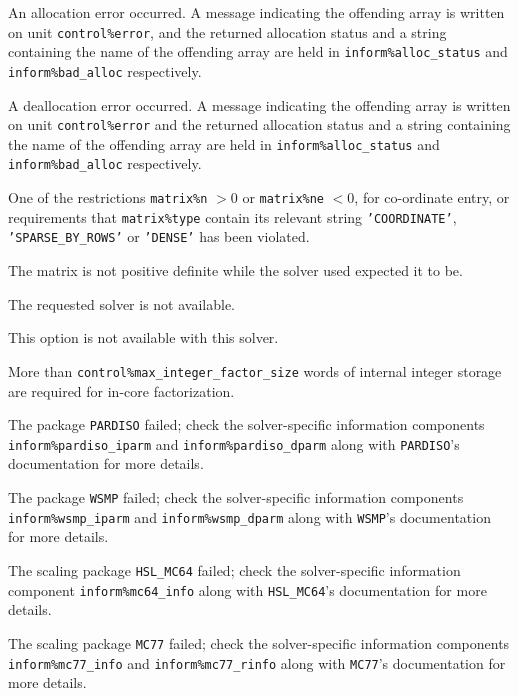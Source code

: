 \documentclass{galahad}
\begin{document}
\begin{description}

\itt{\galerrallocate} An allocation error occurred. A message indicating
the offending
array is written on unit {\tt control\%error}, and the returned allocation
status and a string containing the name of the offending array
are held in {\tt inform\%alloc\_\-status}
and {\tt inform\%bad\_alloc} respectively.

\itt{\galerrdeallocate} A deallocation error occurred.
A message indicating the offending
array is written on unit {\tt control\%error} and the returned allocation
status and a string containing the name of the offending array
are held in {\tt inform\%alloc\_\-status}
and {\tt inform\%bad\_alloc} respectively.

\itt{\galerrrestrictions} One of the restrictions
 {\tt matrix\%n} $> 0$ or
 {\tt matrix\%ne} $< 0$, for co-ordinate entry,
  or requirements that {\tt matrix\%type}
  contain its relevant string
{\tt 'COORDINATE'}, {\tt 'SPARSE\_BY\_ROWS'} or   {\tt 'DENSE'}
  has been violated.

\itt{\galerrinertia} The matrix is not positive definite while the solver
  used expected it to be.

\itt{\galunknownsolver} The requested solver is not available.

\itt{\galerrunavailable} This option is not available with this solver.

 More than {\tt control\%max\_integer\_factor\_size} words of
      internal integer storage are required for in-core factorization.

 The package {\tt PARDISO} failed; check the solver-specific
  information components {\tt inform\%pardiso\_iparm}
  and {\tt inform\%pardiso\_dparm} along with {\tt PARDISO}'s
  documentation for more details.

 The package {\tt WSMP} failed; check the solver-specific
  information components {\tt inform\%wsmp\_iparm}
  and {\tt inform\%\-wsmp\_dparm} along with {\tt WSMP}'s documentation
  for more details.

 The scaling package {\tt HSL\_MC64} failed; check the solver-specific
  information component {\tt inform\%mc64\_info}
  along with {\tt HSL\_MC64}'s documentation for more details.

 The scaling package {\tt MC77} failed; check the solver-specific
  information components {\tt inform\%mc77\_info}
  and {\tt inform\%mc77\_rinfo} along with {\tt MC77}'s documentation
  for more details.


\end{description}
\end{document}
